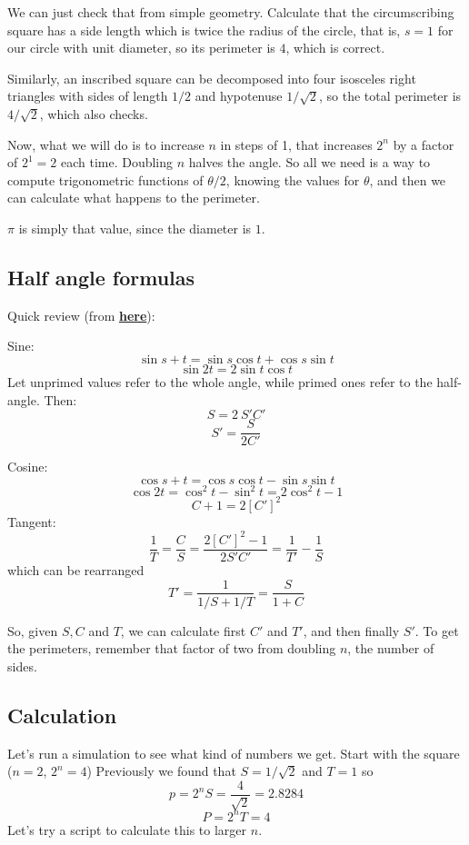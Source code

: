 \documentclass[11pt, oneside]{article}
\begin{document}
We can just check that from simple geometry.  Calculate that the circumscribing square has a side length which is twice the radius of the circle, that is, $s = 1$ for our  circle with unit diameter, so its perimeter is $4$, which is correct.

Similarly, an inscribed square can be decomposed into four isosceles right triangles with sides of length $1/2$ and hypotenuse $1/\sqrt{2}$, so the total perimeter is $4/\sqrt{2}$, which also checks.

Now, what we will do is to increase $n$ in steps of 1, that increases $2^n$ by a factor of $2^1 = 2$ each time.  Doubling $n$ halves the angle.  So all we need is a way to compute trigonometric functions of $\theta/2$, knowing the values for $\theta$, and then we can calculate what happens to the perimeter.

$\pi$ is simply that value, since the diameter is $1$.

\subsection*{Half angle formulas}
Quick review (from \hyperref[sec:sum_angles_similar_tri]{\textbf{here}}):

Sine:
\[ \sin s + t = \sin s \cos t + \cos s \sin t \]
\[ \sin 2t = 2 \sin t \cos t \]
Let unprimed values refer to the whole angle, while primed ones refer to the half-angle.  Then:
\[ S = 2 \ S' C' \]
\[ S' = \frac{S}{2C'} \]

Cosine:
\[ \cos s + t = \cos s \cos t - \sin s \sin t \]
\[ \cos 2t = \cos^2 t - \sin^2 t = 2 \cos^2 t - 1 \]
\[ C + 1 = 2[C']^2 \]
Tangent:
\[ \frac{1}{T} = \frac{C}{S} = \frac{2[C']^2 - 1}{2S'C'} = \frac{1}{T'} - \frac{1}{S} \]
which can be rearranged
\[ T' = \frac{1}{1/S + 1/T} = \frac{S}{1 + C} \]

So, given $S, C$ and $T$, we can calculate first $C'$ and $T'$, and then finally $S'$.  To get the perimeters, remember that factor of two from doubling $n$, the number of sides.

\subsection*{Calculation}

Let's run a simulation to see what kind of numbers we get.  Start with the square ($n=2$, $2^n = 4$)
Previously we found that $S=1/\sqrt{2}$ and $T=1$ so
\[ p = 2^n S = \frac{4}{\sqrt{2}} = 2.8284 \]
\[ P = 2^n T = 4 \]
Let's try a script to calculate this to larger $n$.
\end{document}
